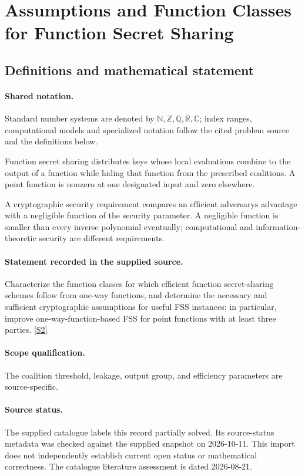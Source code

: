 \documentclass[11pt]{article}
\newcommand{\sref}[2]{\hyperlink{source:#1:#2}{[S#2]}}
\begin{document}
\section{Assumptions and Function Classes for Function Secret Sharing}\label{statement}

\subsection{Definitions and mathematical statement}

\paragraph{Shared notation.}Standard number systems are denoted by $\mathbb N,\mathbb Z,\mathbb Q,\mathbb R,\mathbb C$; index ranges, computational models and specialized notation follow the cited problem source and the definitions below.


Function secret sharing distributes keys whose local evaluations combine to the output of a function while hiding that function from the prescribed coalitions. A point function is nonzero at one designated input and zero elsewhere.

A cryptographic security requirement compares an efficient adversary\textquotesingle s advantage with a negligible function of the security parameter. A negligible function is smaller than every inverse polynomial eventually; computational and information-theoretic security are different requirements.
\paragraph{Statement recorded in the supplied source.}
Characterize the function classes for which efficient function secret-sharing schemes follow from one-way functions, and determine the necessary and sufficient cryptographic assumptions for useful FSS instances; in particular, improve one-way-function-based FSS for point functions with at least three parties. \sref{statement}{2}
\paragraph{Scope qualification.}
The coalition threshold, leakage, output group, and efficiency parameters are source-specific.
\paragraph{Source status.}
The supplied catalogue labels this record partially solved. Its source-status metadata was checked against the supplied snapshot on 2026-10-11. This import does not independently establish current open status or mathematical correctness. The catalogue literature assessment is dated 2026-08-21.
\end{document}
